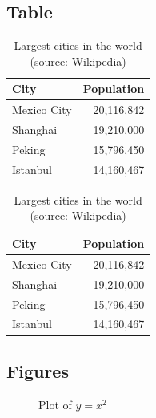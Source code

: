 \documentclass[
11pt,notheorems,hyperref={pdfauthor=whatever}
]{beamer}
\begin{document}
\subsection{Table}
\begin{frame}
    \begin{table}
        \caption{Largest cities in the world (source: Wikipedia)}
        \begin{tabular}{@{} lr @{}}
          \toprule
          City & Population\\
          \midrule
          Mexico City & 20,116,842\\
          Shanghai & 19,210,000\\
          Peking & 15,796,450\\
          Istanbul & 14,160,467\\
          \bottomrule
        \end{tabular}
        \hspace*{1cm}
            \setlength\extrarowheight{3pt}
        \begin{tabular}{|lr|}
          \hline
          \rowcolor{primary}\color{white}City & \color{white}Population\\
          \hline
          Mexico City & 20,116,842\\
          Shanghai & 19,210,000\\
          Peking & 15,796,450\\
          Istanbul & 14,160,467\\
          \hline
        \end{tabular}
    \end{table}
\end{frame}

\subsection{Figures}
\begin{frame}
    \begin{figure}[htbp]
        \centering
        \caption{Plot of $y=x^2$}
    \end{figure}

\end{frame}
\end{document}
